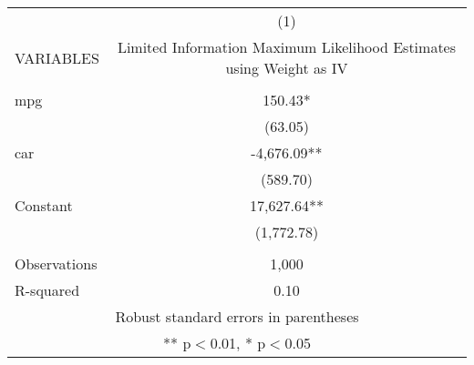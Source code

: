 \begin{tabular}{lc} \hline
 & (1) \\
VARIABLES & Limited Information Maximum Likelihood Estimates using Weight as IV \\ \hline
 &  \\
mpg & 150.43* \\
 & (63.05) \\
car & -4,676.09** \\
 & (589.70) \\
Constant & 17,627.64** \\
 & (1,772.78) \\
 &  \\
Observations & 1,000 \\
 R-squared & 0.10 \\ \hline
\multicolumn{2}{c}{ Robust standard errors in parentheses} \\
\multicolumn{2}{c}{ ** p$<$0.01, * p$<$0.05} \\
\end{tabular}
